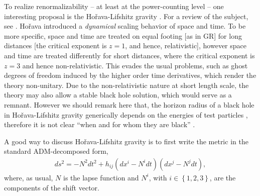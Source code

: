 \documentclass[12pt]{article}
\newcommand{\2}{$^2$}
\newcommand{\3}{$^3$}
\newcommand{\4}{$_4$}
\newcommand{\5}{$_5$}
\begin{document}
\begin{description}
To realize renormalizability -- at least at the power-counting level -- one interesting proposal is the Ho\v{r}ava-Lifshitz gravity \cite{Horava:2009uw}. 
For a review of the subject, see \cite{1010.3218}.
Ho\v{r}ava introduced a \textit{dynamical} scaling behavior of space and time. To be more specific, space and time are treated on equal footing [as in GR] for long distances [the critical exponent is $z=1$, and hence, relativistic], however space and time are treated differently for short distances, where the critical exponent is $z=3$ and hence non-relativistic. This evades the usual problems, such as ghost degrees of freedom induced by the higher order time derivatives, which render the theory non-unitary. 
Due to the non-relativistic nature at short length scale, the theory may also allow a stable black hole solution, which would serve as a remnant. However we should remark here that, the horizon radius of a black hole in Ho\v{r}ava-Lifshitz gravity generically depends on the energies of test particles \cite{1105.4259}, therefore it is not clear ``when
and for whom they are black'' \cite{0910.5487}.

A good way to discuss Ho\v{r}ava-Lifshitz gravity is to first write the metric in the standard ADM-decomposed form,
\begin{eqnarray}
ds^{2} = -N^{2} dt^{2} + h_{ij} \left( dx^{i} - N^{i} dt \right) \left( dx^{j} - N^{j} dt \right),
\end{eqnarray}
where, as usual, $N$ is the lapse function and $N^i$, with $i \in \left\{1,2,3\right\}$, are the components of the shift vector.


\end{description}
\end{document}
